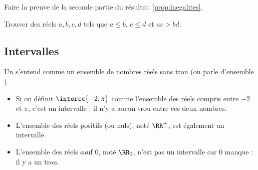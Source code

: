 \begin{frame}
  \begin{exercise}
    Faire la preuve de la seconde partie du résultat~\ref{prop:inegalites}.
  \end{exercise}
  \begin{exercise}
    Trouver des réels \(a,b,c,d\) tels que \(a \leq b\), \(c \leq d\) et \(ac > bd\).
  \end{exercise}
\end{frame}

\subsection{Intervalles}
\begin{frame}
  \begin{definition}
    Un  s'entend comme un ensemble de nombres réels \og sans trou\fg{} (on parle d'ensemble ).
  \end{definition}

  \begin{example}
    \begin{itemize}
    \item Si on définit $\intercc{-2,\pi}$ comme l'ensemble des réels compris entre $-2$ et $\pi$, c'est un intervalle : il n'y a aucun trou entre ces deux nombres.
    \item L'ensemble des réels positifs (ou nuls), noté \(\RR^+\), est également un intervalle.
    \item L'ensemble des réels sauf \(0\), noté \(\RR_0\), n'est pas un intervalle car \(0\) manque : il y a un trou.
    \end{itemize}
  \end{example}
\end{frame}

